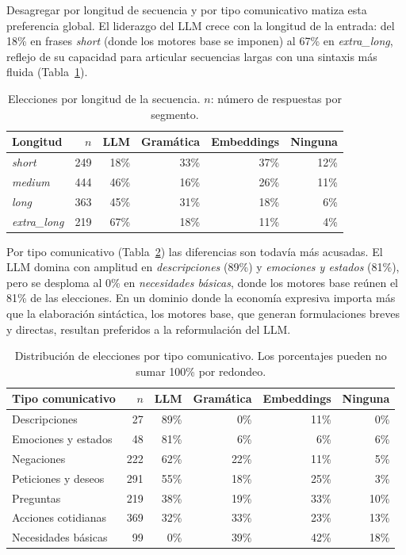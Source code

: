 Desagregar por longitud de secuencia y por tipo comunicativo matiza esta preferencia global. El liderazgo del LLM crece con la longitud de la entrada: del 18\% en frases \textit{short} (donde los motores base se imponen) al 67\% en \textit{extra\_long}, reflejo de su capacidad para articular secuencias largas con una sintaxis más fluida (Tabla~\ref{tab:eval-naturalidad-longitud}).

\begin{table}[ht]
\centering
\small
\begin{tabular}{l r r r r r}
\hline
Longitud & $n$ & LLM & Gramática & Embeddings & Ninguna \\
\hline
\textit{short} & 249 & 18\% & 33\% & 37\% & 12\% \\
\textit{medium} & 444 & 46\% & 16\% & 26\% & 11\% \\
\textit{long} & 363 & 45\% & 31\% & 18\% & 6\% \\
\textit{extra\_long} & 219 & 67\% & 18\% & 11\% & 4\% \\
\hline
\end{tabular}
\caption{Elecciones por longitud de la secuencia. $n$: número de respuestas por segmento.}
\label{tab:eval-naturalidad-longitud}
\end{table}

Por tipo comunicativo (Tabla~\ref{tab:eval-naturalidad-tipo}) las diferencias son todavía más acusadas. El LLM domina con amplitud en \textit{descripciones} (89\%) y \textit{emociones y estados} (81\%), pero se desploma al 0\% en \textit{necesidades básicas}, donde los motores base reúnen el 81\% de las elecciones. En un dominio donde la economía expresiva importa más que la elaboración sintáctica, los motores base, que generan formulaciones breves y directas, resultan preferidos a la reformulación del LLM.

\begin{table}[ht]
\centering
\small
\begin{tabular}{l r r r r r}
\hline
Tipo comunicativo & $n$ & LLM & Gramática & Embeddings & Ninguna \\
\hline
Descripciones & 27 & 89\% & 0\% & 11\% & 0\% \\
Emociones y estados & 48 & 81\% & 6\% & 6\% & 6\% \\
Negaciones & 222 & 62\% & 22\% & 11\% & 5\% \\
Peticiones y deseos & 291 & 55\% & 18\% & 25\% & 3\% \\
Preguntas & 219 & 38\% & 19\% & 33\% & 10\% \\
Acciones cotidianas & 369 & 32\% & 33\% & 23\% & 13\% \\
Necesidades básicas & 99 & 0\% & 39\% & 42\% & 18\% \\
\hline
\end{tabular}
\caption{Distribución de elecciones por tipo comunicativo. Los porcentajes pueden no sumar 100\% por redondeo.}
\label{tab:eval-naturalidad-tipo}
\end{table}

